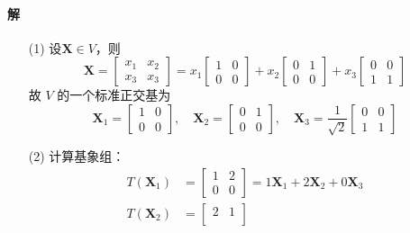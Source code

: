 \documentclass[12pt, a4paper, oneside, fontset=none]{ctexart}
\begin{document}
\paragraph*{解}
\begin{enumerate}
    \item[(1)]
        设$\bm{X} \in V$，则
        \[
            \bm{X} = \begin{bmatrix}
                x_1 & x_2 \\
                x_3 & x_3
            \end{bmatrix} = x_1\begin{bmatrix}
                1 & 0 \\
                0 & 0
            \end{bmatrix} + x_2\begin{bmatrix}
                0 & 1 \\
                0 & 0
            \end{bmatrix} + x_3\begin{bmatrix}
                0 & 0 \\
                1 & 1
            \end{bmatrix}
        \]
        故 $V$ 的一个标准正交基为
        \[
            \bm{X}_1 = \begin{bmatrix}
                1 & 0 \\
                0 & 0
            \end{bmatrix},\quad \bm{X}_2 = \begin{bmatrix}
                0 & 1 \\
                0 & 0
            \end{bmatrix},\quad \bm{X}_3 = \dfrac{1}{\sqrt{2}}\begin{bmatrix}
                0 & 0 \\
                1 & 1
            \end{bmatrix}
        \]
    \item[(2)]
        计算基象组：
        \begin{align*}
            T(\bm{X}_1) & =
            \begin{bmatrix}
                1 & 2 \\
                0 & 0
            \end{bmatrix} = 1\bm{X}_1 + 2\bm{X}_2 + 0\bm{X}_3 \\
            T(\bm{X}_2) & =
            \begin{bmatrix}
                2 & 1 \\

\end{bmatrix}
\end{align*}
\end{enumerate}
\end{document}
